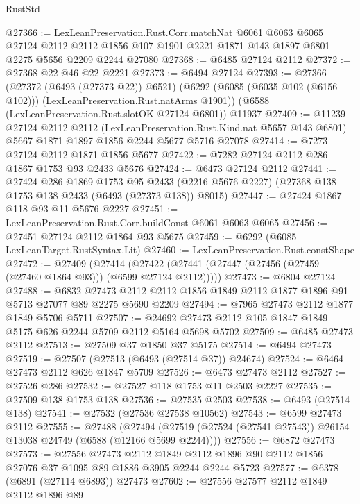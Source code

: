 \begin{lexlean}{RustStd}
\begin{coremodule}
@27366 := LexLeanPreservation.Rust.Corr.matchNat
    @6061
    @6063
    @6065
    @27124
    @2112
    @2112
    @1856
    @107
    @1901
    @2221
    @1871
    @143
    @1897
    @6801
    @2275
    @5656
    @2209
    @2244
    @27080
@27368 := @6485 @27124 @2112
@27372 := @27368 @22 @46 @22 @2221
@27373 := @6494 @27124
@27393 := @27366
    (@27372 (@6493 (@27373 @22)) @6521)
    (@6292 (@6085 (@6035 @102 (@6156 @102))) (LexLeanPreservation.Rust.natArms @1901))
    (@6588 (LexLeanPreservation.Rust.slotOK @27124 @6801))
    @11937
@27409 := @11239
    @27124
    @2112
    @2112
    (LexLeanPreservation.Rust.Kind.nat @5657 @143 @6801)
    @5667
    @1871
    @1897
    @1856
    @2244
    @5677
    @5716
    @27078
@27414 := @7273 @27124 @2112 @1871 @1856 @5677
@27422 := @7282 @27124 @2112 @286 @1867 @1753 @93 @2433 @5676
@27424 := @6473 @27124 @2112
@27441 := @27424
    @286
    @1869
    @1753
    @95
    @2433
    (@2216 @5676 @2227)
    (@27368 @138 @1753 @138 @2433 (@6493 (@27373 @138)) @8015)
@27447 := @27424 @1867 @118 @93 @11 @5676 @2227
@27451 := LexLeanPreservation.Rust.Corr.buildConst @6061 @6063 @6065
@27456 := @27451 @27124 @2112 @1864 @93 @5675
@27459 := @6292 (@6085 LexLeanTarget.RustSyntax.Lit)
@27460 := LexLeanPreservation.Rust.constShape
@27472 := @27409
    (@27414 (@27422 (@27441 (@27447 (@27456 (@27459 (@27460 @1864 @93))) (@6599 @27124 @2112)))))
@27473 := @6804 @27124
@27488 := @6832
    @27473
    @2112
    @2112
    @1856
    @1849
    @2112
    @1877
    @1896
    @91
    @5713
    @27077
    @89
    @2275
    @5690
    @2209
@27494 := @7965 @27473 @2112 @1877 @1849 @5706 @5711
@27507 := @24692 @27473 @2112 @105 @1847 @1849 @5175 @626 @2244 @5709 @2112 @5164 @5698 @5702
@27509 := @6485 @27473 @2112
@27513 := @27509 @37 @1850 @37 @5175
@27514 := @6494 @27473
@27519 := @27507 (@27513 (@6493 (@27514 @37)) @24674)
@27524 := @6464 @27473 @2112 @626 @1847 @5709
@27526 := @6473 @27473 @2112
@27527 := @27526 @286
@27532 := @27527 @118 @1753 @11 @2503 @2227
@27535 := @27509 @138 @1753 @138
@27536 := @27535 @2503
@27538 := @6493 (@27514 @138)
@27541 := @27532 (@27536 @27538 @10562)
@27543 := @6599 @27473 @2112
@27555 := @27488
    (@27494 (@27519 (@27524 (@27541 @27543)) @26154 @13038 @24749 (@6588 (@12166 @5699 @2244))))
@27556 := @6872 @27473
@27573 := @27556
    @27473
    @2112
    @1849
    @2112
    @1896
    @90
    @2112
    @1856
    @27076
    @37
    @1095
    @89
    @1886
    @3905
    @2244
    @2244
    @5723
@27577 := @6378 (@6891 (@27114 @6893)) @27473
@27602 := @27556
    @27577
    @2112
    @1849
    @2112
    @1896
    @89

\end{coremodule}
\end{lexlean}
